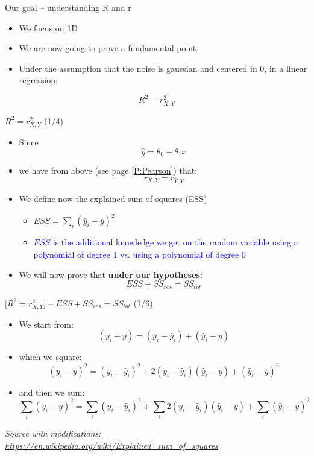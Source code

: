 \documentclass{beamer}
\begin{document}
\begin{frame}
{\centerline{Our goal -- understanding R and r}}
\begin{itemize}
\item We focus on 1D
\item We are now going to prove a fundamental point.
\item Under the assumption that the noise is gaussian and centered in 0, in a linear regression:
\end{itemize}
$$R^2 = r_{X,Y}^2$$
\end{frame}


\begin{frame}
{\centerline{$R^2 = r_{X,Y}^2$ (1/4)}}
\begin{itemize}
\item Since
$$ \hat{y} = \theta_0 + \theta_1 x$$
\item we have from above (see page \ref{P:Pearson}) that:
$$r_{X,Y} = r_{\hat{Y},Y}$$
\item We define now the explained sum of squares (ESS) 
\begin{itemize}
\item $ ESS = \sum_i (\hat{y}_i - \overline{y})^2$
\item \textcolor{blue}{$ ESS $ is the additional knowledge we get on the random variable using a polynomial of degree 1 vs. using a polynomial of degree 0}
\end{itemize}

\item We will now prove that \textbf{under our hypotheses}:
$$ESS + SS_{res} = SS_{tot} $$
\end{itemize}
\end{frame}


\begin{frame}
{\centerline{ [$R^2 = r_{X,Y}^2$] -- $ESS + SS_{res} = SS_{tot} $ (1/6)}}

\begin{itemize}
\item We start from:
$$(y_{i}-{\overline {y}})=(y_{i}-{\hat {y}}_{i})+({\hat {y}}_{i}-{\overline {y}})$$

\item which we square:
$$(y_{i}-{\overline {y}})^2=(y_{i}-{\hat {y}}_{i})^2 + 2(y_{i}-{\hat {y}}_{i})({\hat {y}}_{i}-{\overline {y}}) + ({\hat {y}}_{i}-{\overline {y}})^2$$

\item and then we sum:
$$\sum_i(y_{i}-{\overline {y}})^2=\sum_i(y_{i}-{\hat {y}}_{i})^2 + \sum_i2(y_{i}-{\hat {y}}_{i})({\hat {y}}_{i}-{\overline {y}}) + \sum_i({\hat {y}}_{i}-{\overline {y}})^2$$


\end{itemize}

\textit{\small
Source with modifications: \url{https://en.wikipedia.org/wiki/Explained_sum_of_squares}}
\end{frame}
\end{document}
